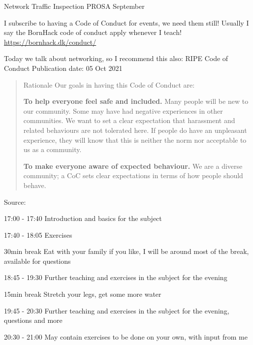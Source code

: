 \documentclass[Screen16to9,17pt]{foils}
\begin{document}
\mytitlepage
{Network Traffic Inspection}
{PROSA September \the\year{}}


\hlkprofiluk



I subscribe to having a Code of Conduct for events, we need them still! Usually I say the BornHack code of conduct apply whenever I teach! \url{https://bornhack.dk/conduct/}

Today we talk about networking, so I recommend this also:
RIPE Code of Conduct
Publication date: 05 Oct 2021

\begin{quote}
Rationale
Our goals in having this Code of Conduct are:
\begin{list2}
\item {\bf To help everyone feel safe and included.} Many people will be new to our community. Some may have had negative experiences in other communities. We want to set a clear expectation that harassment and related behaviours are not tolerated here. If people do have an unpleasant experience, they will know that this is neither the norm nor acceptable to us as a community.

\item {\bf To make everyone aware of expected behaviour.} We are a diverse community; a CoC sets clear expectations in terms of how people should behave.
\end{list2}
\end{quote}
Source: {\small
{}}


\begin{list2}
\item 17:00 - 17:40 Introduction and basics for the subject

\item 17:40 - 18:05 Exercises

\item 30min break Eat with your family if you like, I will be around most of the break, available for questions

\item 18:45 - 19:30 Further teaching and exercises in the subject for the evening

\item 15min break Stretch your legs, get some more water

\item 19:45 - 20:30
Further teaching and exercises in the subject for the evening, questions and more

\item 20:30 - 21:00 May contain exercises to be done on your own, with input from me
\end{list2}
\end{document}
